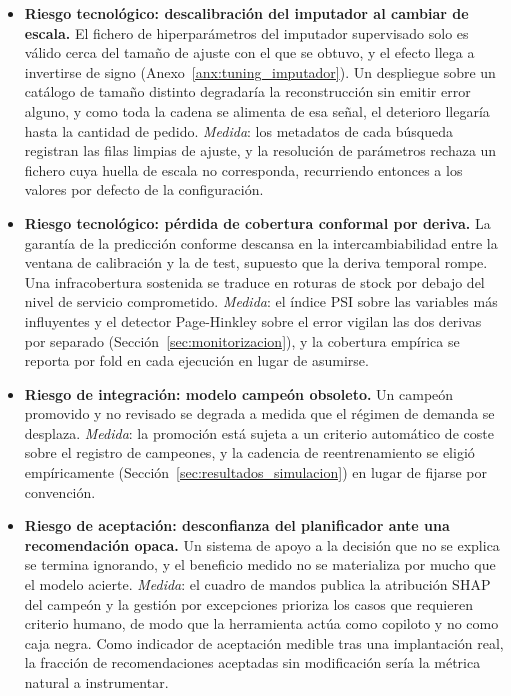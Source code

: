 \begin{itemize}
    \item \textbf{Riesgo tecnológico: descalibración del imputador al cambiar de escala.} El fichero de hiperparámetros del imputador supervisado solo es válido cerca del tamaño de ajuste con el que se obtuvo, y el efecto llega a invertirse de signo (Anexo~\ref{anx:tuning_imputador}). Un despliegue sobre un catálogo de tamaño distinto degradaría la reconstrucción sin emitir error alguno, y como toda la cadena se alimenta de esa señal, el deterioro llegaría hasta la cantidad de pedido. \emph{Medida}: los metadatos de cada búsqueda registran las filas limpias de ajuste, y la resolución de parámetros rechaza un fichero cuya huella de escala no corresponda, recurriendo entonces a los valores por defecto de la configuración.

    \item \textbf{Riesgo tecnológico: pérdida de cobertura conformal por deriva.} La garantía de la predicción conforme descansa en la intercambiabilidad entre la ventana de calibración y la de test, supuesto que la deriva temporal rompe. Una infracobertura sostenida se traduce en roturas de stock por debajo del nivel de servicio comprometido. \emph{Medida}: el índice PSI sobre las variables más influyentes y el detector Page-Hinkley sobre el error vigilan las dos derivas por separado (Sección~\ref{sec:monitorizacion}), y la cobertura empírica se reporta por fold en cada ejecución en lugar de asumirse.

    \item \textbf{Riesgo de integración: modelo campeón obsoleto.} Un campeón promovido y no revisado se degrada a medida que el régimen de demanda se desplaza. \emph{Medida}: la promoción está sujeta a un criterio automático de coste sobre el registro de campeones, y la cadencia de reentrenamiento se eligió empíricamente (Sección~\ref{sec:resultados_simulacion}) en lugar de fijarse por convención.

    \item \textbf{Riesgo de aceptación: desconfianza del planificador ante una recomendación opaca.} Un sistema de apoyo a la decisión que no se explica se termina ignorando, y el beneficio medido no se materializa por mucho que el modelo acierte. \emph{Medida}: el cuadro de mandos publica la atribución SHAP del campeón y la gestión por excepciones prioriza los casos que requieren criterio humano, de modo que la herramienta actúa como copiloto y no como caja negra. Como indicador de aceptación medible tras una implantación real, la fracción de recomendaciones aceptadas sin modificación sería la métrica natural a instrumentar.


\end{itemize}
